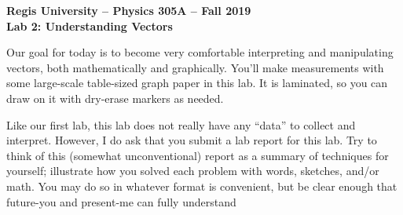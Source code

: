 \documentclass[11pt]{article}
\begin{document}
\begin{center}
{\bf{Regis University -- Physics 305A -- Fall 2019}} \\
{\bf{Lab 2: Understanding Vectors}} \\
\medskip
\end{center}

\medskip 

\noindent Our goal for today is to become very comfortable interpreting and manipulating vectors, both mathematically and graphically. You'll make measurements with some large-scale table-sized graph paper in this lab.  It is laminated, so you can draw on it with dry-erase markers as needed.

Like our first lab, this lab does not really have any ``data'' to collect and interpret. However, I do ask that you submit a lab report for this lab. Try to think of this (somewhat unconventional) report as a summary of techniques for yourself; illustrate how you solved each problem with words, sketches, and/or math. You may do so in whatever format is convenient, but be clear enough that future-you and present-me can fully understand 
\end{document}
